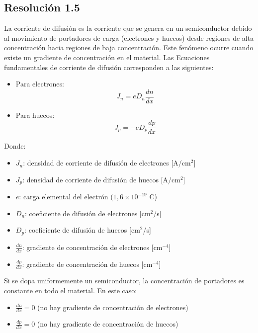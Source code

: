 \documentclass[
  11pt,
  letterpaper,
   addpoints,
   answers
  ]{exam}
\begin{document}
\begin{questions}
\begin{solution}
\subsection*{Resolución 1.5}
La corriente de difusión es la corriente que se genera en un semiconductor debido al movimiento de portadores de carga (electrones y huecos) desde regiones de alta concentración hacia regiones de baja concentración. Este fenómeno ocurre cuando existe un gradiente de concentración en el material. Las Ecuaciones fundamentales de corriente de difusión corresponden a las siguientes:

\begin{itemize}
    \item Para electrones:
    \begin{equation}
        J_n = eD_n \frac{dn}{dx}
    \end{equation}
    \item Para huecos:
    \begin{equation}
        J_p = -eD_p \frac{dp}{dx}
    \end{equation}
\end{itemize}

Donde:
\begin{itemize}
    \item $J_n$: densidad de corriente de difusión de electrones [A/cm$^2$]
    \item $J_p$: densidad de corriente de difusión de huecos [A/cm$^2$]
    \item $e$: carga elemental del electrón ($1{,}6 \times 10^{-19}$ C)
    \item $D_n$: coeficiente de difusión de electrones [cm$^2$/s]
    \item $D_p$: coeficiente de difusión de huecos [cm$^2$/s]
    \item $\frac{dn}{dx}$: gradiente de concentración de electrones [cm$^{-4}$]
    \item $\frac{dp}{dx}$: gradiente de concentración de huecos [cm$^{-4}$]
\end{itemize}

Si se dopa uniformemente un semiconductor, la concentración de portadores es constante en todo el material. En este caso:
\begin{itemize}
    \item $\frac{dn}{dx} = 0$ (no hay gradiente de concentración de electrones)
    \item $\frac{dp}{dx} = 0$ (no hay gradiente de concentración de huecos)
\end{itemize}


\end{solution}
\end{questions}
\end{document}
